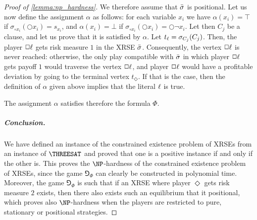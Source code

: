\begin{proof}[Proof of \cref{lemma:np_hardness}]
We therefore assume that ${\bar{\sigma}}$ is positional.
Let us now define the assignment $\alpha$ as follows: for each variable $x_i$ we have $\alpha(x_i) = \top$ if $\sigma_{\circ x_i}(\Circle x_i) = s_{x_i}$, and $\alpha(x_i) = \bot$ if $\sigma_{\circ x_i}(\Circle x_i) = \Circle \neg x_i$.
Let then $C_j$ be a clause, and let us prove that it is satisfied by $\alpha$.
Let $t_\ell = \sigma_{C_j}(C_j)$.
Then, the player $\Square \l$ gets risk measure $1$ in the XRSE ${\bar{\sigma}}$.
Consequently, the vertex $\Square \l$ is never reached: otherwise, the only play compatible with ${\bar{\sigma}}$ in which player $\Square \l$ gets payoff $1$ would traverse the vertex $\Square \l$, and player $\Square \l$ would have a profitable deviation by going to the terminal vertex $t_\Diamond$.
If that is the case, then the definition of $\alpha$ given above implies that the literal $\ell$ is true.

The assignment $\alpha$ satisfies therefore the formula $\Phi$.

\subparagraph*{Conclusion.}
We have defined an instance of the constrained existence problem of XRSEs from an instance of $\THREESAT$ and proved that one is a positive instance if and only if the other is.
This proves the $\NP$-hardness of the constrained existence problem of XRSEs, since the game $\Game_\Phi$ can clearly be constructed in polynomial time.
Moreover, the game $\Game_\Phi$ is such that if an XRSE where player $\Diamond$ gets risk measure $2$ exists, then there also exists such an equilibrium that it positional, which proves also $\NP$-hardness when the players are restricted to pure, stationary or positional strategies.
\end{proof}
